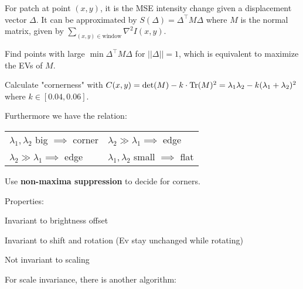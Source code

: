 \begin{definition}
For patch at point \((x, y)\), it is the MSE intensity change given a displacement vector \(\Delta\).
It can be approximated by \(S(\Delta) = \Delta^\top M \Delta\)
where \(M\) is the normal matrix, given by \(\sum_{(x, y) \in \text{window}} \nabla^2 I(x, y)\).

\end{definition}

\begin{algorithm}
  Find points with large \(\min \Delta^\top M \Delta\) for \(||\Delta|| = 1\), which is equivalent to maximize the EVs of \(M\).

  Calculate "cornerness" with \(C(x, y) = \det(M) - k \cdot \operatorname{Tr}(M)^2 = \lambda_1 \lambda_2 - k(\lambda_1 + \lambda_2)^2\) where \(k \in [0.04, 0.06]\).

  Furthermore we have the relation:

  \begin{center}
    \begin{tabularx}{\linewidth}{XX}
      \(\lambda_1, \lambda_2\) big \(\implies\) corner & \(\lambda_2 \gg \lambda_1 \implies\) edge \\
      \(\lambda_2 \gg \lambda_1 \implies\) edge & \(\lambda_1, \lambda_2\) small \(\implies\) flat
    \end{tabularx}
  \end{center}

  Use \textbf{non-maxima suppression} to decide for corners.

  Properties:
  \begin{itemize*}
    \item Invariant to brightness offset
    \item Invariant to shift and rotation (Ev stay unchanged while rotating)
    \item Not invariant to scaling
  \end{itemize*}
\end{algorithm}

For scale invariance, there is another algorithm:

